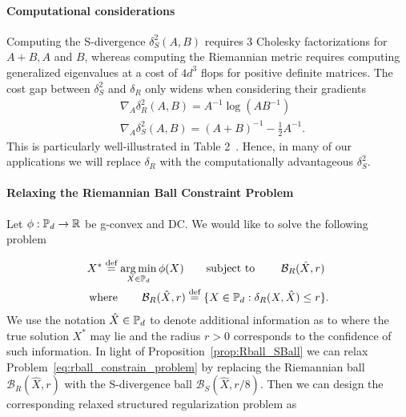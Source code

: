 \documentclass[sn-nature]{sn-jnl}%
\theoremstyle{thmstyleone}%
\theoremstyle{thmstyletwo}%
\theoremstyle{thmstylethree}%
\begin{document}
\paragraph{Computational considerations}
Computing the S-divergence $\delta_S^2(A,B)$ requires 3 Cholesky factorizations for $A+B, A$ and $B$, whereas computing the Riemannian metric requires computing generalized eigenvalues at a cost of $4d^3$ flops for positive definite matrices. The cost gap between $\delta_S^2$ and $\delta_R$ only widens when considering their gradients 
\[
\begin{aligned}
& \nabla_A \delta_R^2(A, B)=A^{-1} \log \left(A B^{-1}\right) \\
& \nabla_A \delta_S^2(A, B)=(A+B)^{-1}-\frac{1}{2} A^{-1}.
\end{aligned}
\]
This is particularly well-illustrated in Table 2~\cite{efficientsimilarityCherian}. %
Hence, in many of our applications we will replace $\delta_R$ with the computationally advantageous $\delta_S^2$.


\paragraph{Relaxing the Riemannian Ball Constraint Problem} 
Let $\phi: \mathbb{P}_d \to \mathbb{R}$ be g-convex and DC. We would like to solve the following problem

\begin{equation}\label{eq:rball_constrain_problem}
    \begin{aligned}
        &X^* \stackrel{\text{def}}{=} \operatorname*{arg\,min}_{X \in \mathbb{P}_d} \phi(X) \qquad \text{subject to } \qquad \mathcal{B}_{R}(\hat{X}, r) 
        \\& \operatorname{where} \qquad \mathcal{B}_{R}(\hat{X}, r) \stackrel{\text{def}}{=} \{X \in \mathbb{P}_d : {\delta_R}(X, \hat{X}) \leq r\}.
    \end{aligned}
\end{equation}
We use the notation $\hat{X} \in \mathbb{P}_d$ to denote additional information as to where the true solution $X^*$ may lie and the radius $r>0$  corresponds to the confidence of such information. In light of Proposition~\ref{prop:Rball_SBall}
we can relax Problem~\ref{eq:rball_constrain_problem} by replacing the Riemannian ball $\mathcal{B}_R(\hat{X}, r)$ with the S-divergence ball $\mathcal{B}_S(\hat{X}, r/8)$. Then we can design the corresponding relaxed structured regularization problem as 
\end{document}
